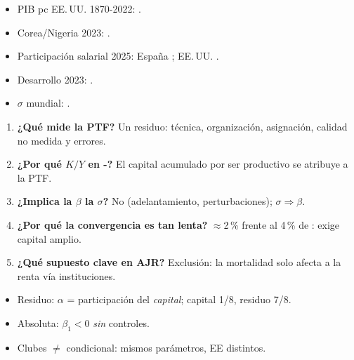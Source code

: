 \documentclass{article}
\begin{document}
\begin{columnas}
\anexorepaso
{}
\begin{itemize}
\item PIB pc EE.\,UU. 1870-2022: .
\item Corea/Nigeria 2023: .
\item Participación salarial 2025: España ; EE.\,UU. .
\item Desarrollo 2023: .
\item $\sigma$ mundial: .
\end{itemize}
\begin{enumerate}
\item \textbf{¿Qué mide la PTF?} Un residuo: técnica, organización, asignación, calidad no medida y errores.
\item \textbf{¿Por qué $K/Y$ en -?} El capital acumulado por ser productivo se atribuye a la PTF.
\item \textbf{¿Implica la $\beta$ la $\sigma$?} No (adelantamiento, perturbaciones); $\sigma\Rightarrow\beta$.
\item \textbf{¿Por qué la convergencia es tan lenta?} $\approx$2\,\% frente al 4\,\% de : exige capital amplio.
\item \textbf{¿Qué supuesto clave en AJR?} Exclusión: la mortalidad solo afecta a la renta vía instituciones.
\end{enumerate}
\begin{trampa}
\begin{itemize}
\item Residuo: $\alpha$ = participación del \emph{capital}; capital 1/8, residuo 7/8.
\item Absoluta: $\beta_1<0$ \emph{sin} controles.
\item Clubes $\neq$ condicional: mismos parámetros, EE distintos.
\end{itemize}
\end{trampa}

\end{columnas}
\end{document}
